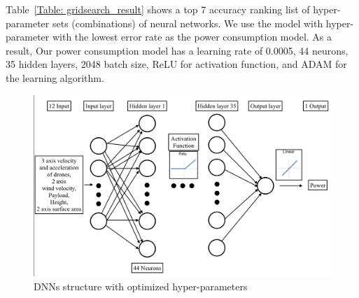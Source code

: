 \documentclass[journal]{./template/IEEEtran}
\begin{document}
\begin{table}[ht]
\caption{The list of grid search results}
\label{Table: gridsearch_result}
\end{table}

Table~\ref{Table: gridsearch_result} shows a top 7 accuracy ranking list of hyper-parameter sets (combinations) of neural networks.
We use the model with hyper-parameter with the lowest error rate as the power consumption model. As a result, Our power consumption model has a learning rate of 0.0005, 44 neurons, 35 hidden layers, 2048 batch size, ReLU for activation function, and ADAM for the learning algorithm. 

\begin{figure}[htbp]
\centering\includegraphics[scale=0.25]{fig6/NN_structure.pdf}
\caption{DNNs structure with optimized hyper-parameters}
\label{fig:DNN_structure}
\end{figure}
\end{document}
